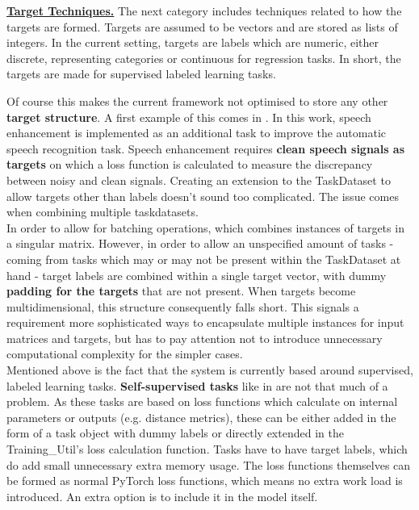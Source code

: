 \underline{\textbf{Target Techniques.}} The next category includes techniques related to how the targets are formed. Targets are assumed to be vectors and are stored as lists of integers. In the current setting, targets are labels which are numeric, either discrete, representing categories or continuous for regression tasks. In short, the targets are made for supervised labeled learning tasks.

Of course this makes the current framework not optimised to store any other \textbf{target structure}. A first example of this comes in \cite{lu2004multitask}. In this work, speech enhancement is implemented as an additional task to improve the automatic speech recognition task. Speech enhancement requires \textbf{clean speech signals as targets} on which a loss function is calculated to measure the discrepancy between noisy and clean signals. Creating an extension to the TaskDataset to allow targets other than labels doesn't sound too complicated. The issue comes when combining multiple taskdatasets.\\

In order to allow for batching operations, which combines instances of targets in a singular matrix. However, in order to allow an unspecified amount of tasks - coming from tasks which may or may not be present within the TaskDataset at hand - target labels are combined within a single target vector, with dummy \textbf{padding for the targets} that are not present. When targets become multidimensional, this structure consequently falls short. This signals a requirement more sophisticated ways to encapsulate multiple instances for input matrices and targets, but has to pay attention not to introduce unnecessary computational complexity for the simpler cases. \\

Mentioned above is the fact that the system is currently based around supervised, labeled learning tasks. \textbf{Self-supervised tasks} like in \cite{lee2019label} are not that much of a problem. As these tasks are based on loss functions which calculate on internal parameters or outputs (e.g. distance metrics), these can be either added in the form of a task object with dummy labels or directly extended in the Training\_Util's loss calculation function. Tasks have to have target labels, which do add small unnecessary extra memory usage. The loss functions themselves can be formed as normal PyTorch loss functions, which means no extra work load is introduced. An extra option is to include it in the model itself.\\

